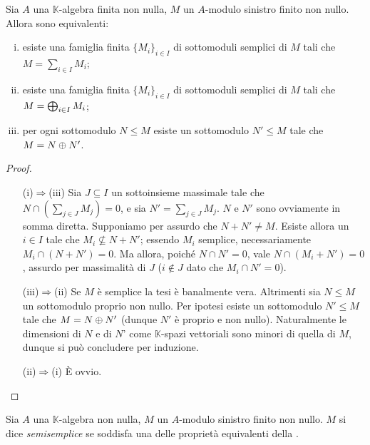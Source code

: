 \begin{proposition}
Sia $A$ una $\mathbb{K}$-algebra finita non nulla, $M$ un $A$-modulo sinistro finito non nullo. Allora sono equivalenti:
\begin{enumerate}[(i)]
\item esiste una famiglia finita $\{M_i\}_{i\in I}$ di sottomoduli semplici di $M$ tali che $M=\sum_{i\in I}M_i$;
\item esiste una famiglia finita $\{M_i\}_{i\in I}$ di sottomoduli semplici di $M$ tali che $M=\bigoplus_{i\in I}M_i$;
\item per ogni sottomodulo $N\le M$ esiste un sottomodulo $N'\le M$ tale che $M=N\oplus N'$.
\end{enumerate}
\end{proposition}
\begin{proof}
\leavevmode
\begin{itemize}
\item[(i)$\Rightarrow$(iii)] Sia $J\subseteq I$ un sottoinsieme massimale tale che $N\cap\left(\sum_{j\in J}M_j\right)=0$, e sia $N'=\sum_{j\in J}M_j$. $N$ e $N'$ sono ovviamente in somma diretta. Supponiamo per assurdo che $N+N'\neq M$. Esiste allora un $i\in I$ tale che $M_i\not\subseteq N+N'$; essendo $M_i$ semplice, necessariamente $M_i\cap (N+N')=0$. Ma allora, poiché $N\cap N'=0$, vale $N\cap(M_i+N')=0$, assurdo per massimalità di $J$ ($i\not\in J$ dato che $M_i\cap N'=0$).
\item[(iii)$\Rightarrow$(ii)] Se $M$ è semplice la tesi è banalmente vera. Altrimenti sia $N\le M$ un sottomodulo proprio non nullo. Per ipotesi esiste un sottomodulo $N'\le M$ tale che $M=N\oplus N'$ (dunque $N'$ è proprio e non nullo). Naturalmente le dimensioni di $N$ e di $N$' come $\mathbb{K}$-spazi vettoriali sono minori di quella di $M$, dunque si può concludere per induzione.
\item[(ii)$\Rightarrow$(i)] È ovvio.
\end{itemize}
\end{proof}

\begin{definition}
Sia $A$ una $\mathbb{K}$-algebra non nulla, $M$ un $A$-modulo sinistro finito non nullo. $M$ si dice \emph{semisemplice} se soddisfa una delle proprietà equivalenti della .
\end{definition}


